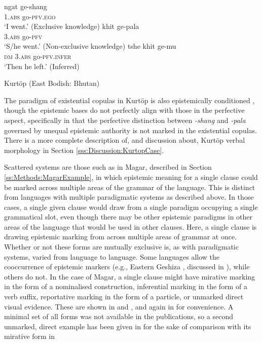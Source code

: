 \begin{exe}
        \ex\label{e:Description:KurtopPerfective}
        \begin{xlist}
                \ex 
                \gll ngat ge-shang \\
                1.\textsc{abs} go-\textsc{pfv.ego} \\
                \glt `I went.' (Exclusive knowledge) \cite[130]{Hyslop2018}
                \ex 
                \gll khit ge-pala \\
                3.\textsc{abs} go-\textsc{pfv} \\
                \glt `S/he went.' (Non-exclusive knowledge) \cite[130]{Hyslop2018}
                \ex 
                \gll tshe khit ge-mu \\
                \textsc{dm} 3.\textsc{abs} go-\textsc{pfv.infer} \\
                \glt `Then he left.' (Inferred) \cite[115]{Hyslop2014}
        \end{xlist}
        Kurtöp (East Bodish: Bhutan)
\end{exe}

The paradigm of existential copulas in Kurtöp is also epistemically conditioned \cite{Hyslop2014}, though the epistemic bases do not perfectly align with those in the perfective aspect, specifically in that the perfective distinction between \textit{-shang} and \textit{-pala} governed by unequal epistemic authority is not marked in the existential copulas. There is a more complete description of, and discussion about, Kurtöp verbal morphology in Section \ref{sss:Discussion:KurtopCase}.

Scattered systems are those such as in Magar, described in Section \ref{ss:Methods:MagarExample}, in which epistemic meaning for a single clause could be marked across multiple areas of the grammar of the language. This is distinct from languages with multiple paradigmatic systems as described above. In those cases, a single given clause would draw from a single paradigm occupying a single grammatical slot, even though there may be other epistemic paradigms in other areas of the language that would be used in other clauses. Here, a single clause is drawing epistemic marking from across multiple areas of grammar at once. Whether or not these forms are mutually exclusive is, as with paradigmatic systems, varied from language to language. Some languages allow the cooccurrence of epistemic markers (e.g., Eastern Geshiza \cite[rGyalrongic: PRC,][]{Honkasalo2019}, discussed in ), while others do not. In the case of Magar, a single clause might have mirative marking in the form of a nominalised construction, inferential marking in the form of a verb suffix, reportative marking in the form of a particle, or unmarked direct visual evidence. These are shown in  and , and again in  for convenience. A minimal set of all forms was not available in the publications, so a second unmarked, direct example has been given in  for the sake of comparison with its mirative form in 

